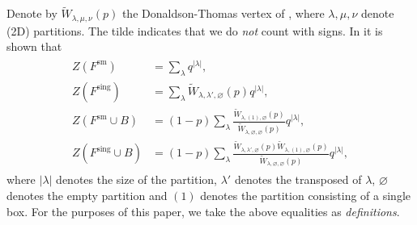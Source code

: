 \documentclass{amsart}
\theoremstyle{definition}
\newcommand{\sm}{\mathrm{sm}}
\newcommand{\sing}{\mathrm{sing}}
\begin{document}
Denote by $\tilde{W}_{\lambda,\mu,\nu}(p)$ the Donaldson-Thomas vertex of \cite{MNOP1, MNOP2}, where $\lambda, \mu, \nu$ denote (2D) partitions. The tilde indicates that we do \emph{not} count with signs. In \cite{BK} it is shown that
\begin{align} \label{Z}
\begin{split}
Z(F^{\sm}) &= \sum_\lambda q^{|\lambda|}, \\
Z(F^{\sing}) &= \sum_\lambda \tilde{W}_{\lambda,\lambda',\varnothing}(p) q^{|\lambda|}, \\
Z(F^{\sm} \cup B) &= (1-p) \sum_\lambda \frac{\tilde{W}_{\lambda, (1), \varnothing}(p)}{\tilde{W}_{\lambda, \varnothing, \varnothing}(p)} q^{|\lambda|}, \\
Z(F^{\sing} \cup B) &= (1-p) \sum_\lambda \frac{\tilde{W}_{\lambda, \lambda', \varnothing}(p) \tilde{W}_{\lambda, (1), \varnothing}(p)}{\tilde{W}_{\lambda, \varnothing, \varnothing}(p)} q^{|\lambda|},
\end{split}
\end{align}
where $|\lambda|$ denotes the size of the partition, $\lambda'$ denotes the transposed of $\lambda$, $\varnothing$ denotes the empty partition and $(1)$ denotes the partition consisting of a single box. For the purposes of this paper, we take the above equalities as \emph{definitions}.
\end{document}
